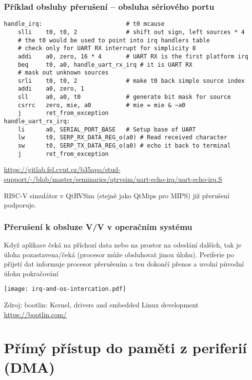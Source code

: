 \documentclass{beamer}
\begin{document}
\begin{frame}[fragile]
\frametitle{Příklad obsluhy přerušení -- obsluha sériového portu}

\begin{verbatim}
handle_irq:                        # t0 mcause
    slli    t0, t0, 2              # shift out sign, left sources * 4
    # the t0 would be used to point into irq handlers table
    # check only for UART RX interrupt for simplicity 8
    addi    a0, zero, 16 * 4       # UART RX is the first platform irq
    beq     t0, a0, handle_uart_rx_irq # it is UART RX
    # mask out unknown sources
    srli    t0, t0, 2              # make t0 back simple source index
    addi    a0, zero, 1
    sll     a0, a0, t0             # generate bit mask for source
    csrrc   zero, mie, a0          # mie = mie & ~a0
    j       ret_from_exception
handle_uart_rx_irq:
    li      a0, SERIAL_PORT_BASE   # Setup base of UART
    lw      t0, SERP_RX_DATA_REG_o(a0) # Read received character
    sw      t0, SERP_TX_DATA_REG_o(a0) # echo it back to terminal
    j       ret_from_exception
\end{verbatim}

\tiny

\url{https://gitlab.fel.cvut.cz/b35apo/stud-support/-/blob/master/seminaries/qtrvsim/uart-echo-irq/uart-echo-irq.S}

RISC-V simulátor v QtRVSim (stejně jako QtMips pro MIPS) již přerušení podporuje.

\end{frame}

\begin{frame}
\frametitle{Přerušení k obsluze V/V v operačním systému}

Když aplikace čeká na příchozí data nebo na prostor na odeslání dalších, tak je úloha pozastavena/čeká (procesor může obsluhovat jinou úlohu).
Periferie po přijetí dat informuje procesor přerušením a ten dokončí přenos a uvolní původní úlohu pokračování

\begin{center}
  \texttt{[image: irq-and-os-intercation.pdf]}
\end{center}

\tiny

Zdroj: bootlin: Kernel, drivers and embedded Linux development \url{https://bootlin.com/}

\end{frame}

\section{Přímý přístup do paměti z periferií (DMA)}
\end{document}
